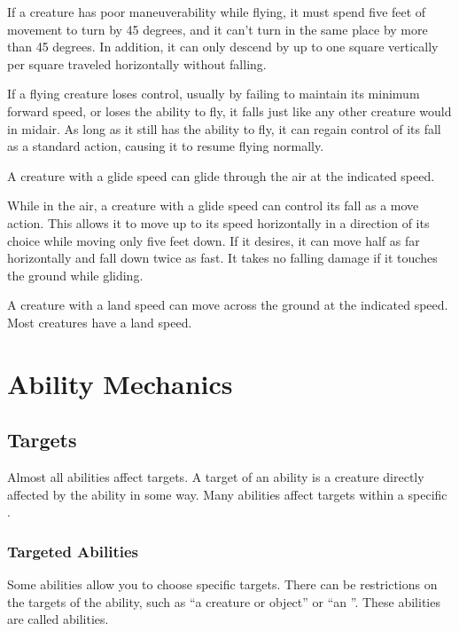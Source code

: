          If a creature has poor maneuverability while flying, it must spend five feet of movement to turn by 45 degrees, and it can't turn in the same place by more than 45 degrees. In addition, it can only descend by up to one square vertically per square traveled horizontally without falling.

         If a flying creature loses control, usually by failing to maintain its minimum forward speed, or loses the ability to fly, it falls just like any other creature would in midair. As long as it still has the ability to fly, it can regain control of its fall as a standard action, causing it to resume flying normally.

        \label{Gliding}
        A creature with a glide speed can glide through the air at the indicated speed.

        While in the air, a creature with a glide speed can control its fall as a move action. This allows it to move up to its speed horizontally in a direction of its choice while moving only five feet down. If it desires, it can move half as far horizontally and fall down twice as fast. It takes no falling damage if it touches the ground while gliding.

        A creature with a land speed can move across the ground at the indicated speed.
        Most creatures have a land speed.

\section{Ability Mechanics}\label{Ability Mechanics}

    \subsection{Targets}\label{Targets}
        Almost all abilities affect targets.
        A target of an ability is a creature directly affected by the ability in some way.
        Many abilities affect targets within a specific .

        \subsubsection{Targeted Abilities}\label{Targeted Abilities}
            Some abilities allow you to choose specific targets.
            There can be restrictions on the targets of the ability, such as ``a creature or object'' or ``an ''.
            These abilities are called  abilities.

